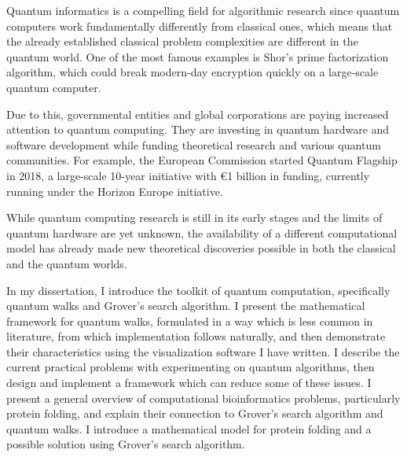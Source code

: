 Quantum informatics is a compelling field for algorithmic research since quantum computers work fundamentally differently from classical ones, which means that the already established classical problem complexities are different in the quantum world. One of the most famous examples is Shor's prime factorization algorithm, which could break modern-day encryption quickly on a large-scale quantum computer.

Due to this, governmental entities and global corporations are paying increased attention to quantum computing. They are investing in quantum hardware and software development while funding theoretical research and various quantum communities. For example, the European Commission started Quantum Flagship in 2018, a large-scale 10-year initiative with €1 billion in funding, currently running under the Horizon Europe initiative.

While quantum computing research is still in its early stages and the limits of quantum hardware are yet unknown, the availability of a different computational model has already made new theoretical discoveries possible in both the classical and the quantum worlds.

In my dissertation, I introduce the toolkit of quantum computation, specifically quantum walks and Grover's search algorithm. I present the mathematical framework for quantum walks, formulated in a way which is less common in literature, from which implementation follows naturally, and then demonstrate their characteristics using the visualization software I have written. I describe the current practical problems with experimenting on quantum algorithms, then design and implement a framework which can reduce some of these issues. I present a general overview of computational bioinformatics problems, particularly protein folding, and explain their connection to Grover's search algorithm and quantum walks. I introduce a mathematical model for protein folding and a possible solution using Grover's search algorithm.

\vfill
\selectthesislanguage

\setcounter{romanPage}{\value{page}}

